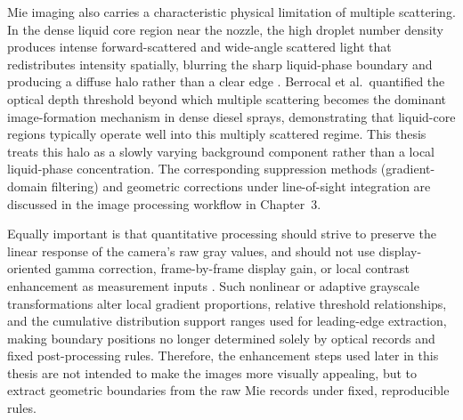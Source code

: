 Mie imaging also carries a characteristic physical limitation of multiple scattering.
In the dense liquid core region near the nozzle, the high droplet number density produces intense forward-scattered and wide-angle scattered light that redistributes intensity spatially, blurring the sharp liquid-phase boundary and producing a diffuse halo rather than a clear edge \cite{BohrenHuffman2004,Linne2013SprayImaging,Berrocal2007MultipleScattering}.
Berrocal et al.\ quantified the optical depth threshold beyond which multiple scattering becomes the dominant image-formation mechanism in dense diesel sprays, demonstrating that liquid-core regions typically operate well into this multiply scattered regime.
This thesis treats this halo as a slowly varying background component rather than a local liquid-phase concentration. The corresponding suppression methods (gradient-domain filtering) and geometric corrections under line-of-sight integration are discussed in the image processing workflow in Chapter~3.

Equally important is that quantitative processing should strive to preserve the linear response of the camera's raw gray values, and should not use display-oriented gamma correction, frame-by-frame display gain, or local contrast enhancement as measurement inputs \cite{Cromey2010TwistedPixels}.
Such nonlinear or adaptive grayscale transformations alter local gradient proportions, relative threshold relationships, and the cumulative distribution support ranges used for leading-edge extraction, making boundary positions no longer determined solely by optical records and fixed post-processing rules.
Therefore, the enhancement steps used later in this thesis are not intended to make the images more visually appealing, but to extract geometric boundaries from the raw Mie records under fixed, reproducible rules.

